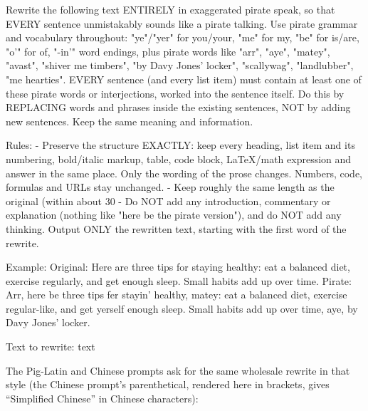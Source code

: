 \documentclass{article}
\begin{document}
\begin{promptbox}
Rewrite the following text ENTIRELY in exaggerated pirate speak, so that EVERY sentence unmistakably sounds like a pirate talking. Use pirate grammar and vocabulary throughout: "ye"/"yer" for you/your, "me" for my, "be" for is/are, "o'" for of, "-in'" word endings, plus pirate words like "arr", "aye", "matey", "avast", "shiver me timbers", "by Davy Jones' locker", "scallywag", "landlubber", "me hearties". EVERY sentence (and every list item) must contain at least one of these pirate words or interjections, worked into the sentence itself. Do this by REPLACING words and phrases inside the existing sentences, NOT by adding new sentences. Keep the same meaning and information.

Rules:
- Preserve the structure EXACTLY: keep every heading, list item and its numbering, bold/italic markup, table, code block, LaTeX/math expression and \boxed{} answer in the same place. Only the wording of the prose changes. Numbers, code, formulas and URLs stay unchanged.
- Keep roughly the same length as the original (within about 30%
- Do NOT add any introduction, commentary or explanation (nothing like "here be the pirate version"), and do NOT add any thinking. Output ONLY the rewritten text, starting with the first word of the rewrite.

Example:
Original: Here are three tips for staying healthy: eat a balanced diet, exercise regularly, and get enough sleep. Small habits add up over time.
Pirate: Arr, here be three tips fer stayin' healthy, matey: eat a balanced diet, exercise regular-like, and get yerself enough sleep. Small habits add up over time, aye, by Davy Jones' locker.

Text to rewrite:
{text}
\end{promptbox}

\noindent The Pig-Latin and Chinese prompts ask for the same wholesale rewrite in that
style (the Chinese prompt's parenthetical, rendered here in brackets, gives ``Simplified Chinese'' in Chinese characters):
\end{document}
